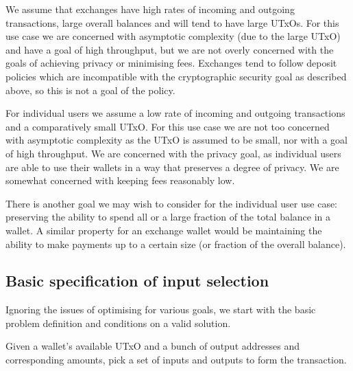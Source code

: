 \documentclass{article}
\begin{document}
We assume that exchanges have high rates of incoming and outgoing transactions,
large overall balances and will tend to have large UTxOs. For this use case we
are concerned with asymptotic complexity (due to the large UTxO) and have a
goal of high throughput, but we are not overly concerned with the goals of
achieving privacy or minimising fees. Exchanges tend to follow deposit policies
which are incompatible with the cryptographic security goal as described above,
so this is not a goal of the policy.

For individual users we assume a low rate of incoming and outgoing transactions
and a comparatively small UTxO. For this use case we are not too concerned with
asymptotic complexity as the UTxO is assumed to be small, nor with a goal of
high throughput. We are concerned with the privacy goal, as individual users
are able to use their wallets in a way that preserves a degree of privacy. We
are somewhat concerned with keeping fees reasonably low.

There is another goal we may wish to consider for the individual user use case:
preserving the ability to spend all or a large fraction of the total balance in
a wallet. A similar property for an exchange wallet would be maintaining the
ability to make payments up to a certain size (or fraction of the overall
balance).

\subsection{Basic specification of input selection}

Ignoring the issues of optimising for various goals, we start with the basic
problem definition and conditions on a valid solution.

Given a wallet's available UTxO and a bunch of output addresses and corresponding
amounts, pick a set of inputs and outputs to form the transaction.
\end{document}
